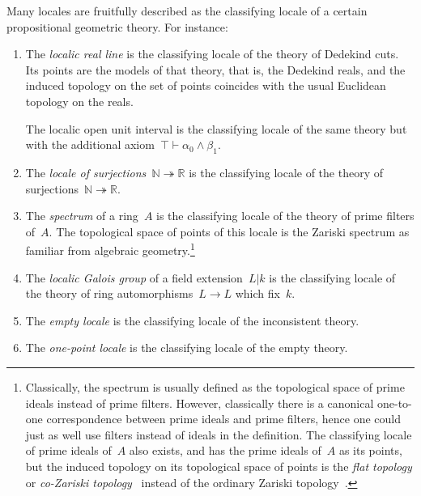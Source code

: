 \documentclass{ws-rv9x6}
\newcommand{\NN}{\mathbb{N}}
\newcommand{\RR}{\mathbb{R}}
\renewcommand{\_}{\mathpunct{.}}
\newcommand{\?}{\,{:}\,}
\begin{document}
Many locales are fruitfully described as the classifying locale of a certain
propositional geometric theory. For instance:
\begin{enumerate}
\item The \emph{localic real line} is the classifying locale of the theory of
Dedekind cuts. Its points are the models of that theory, that is, the Dedekind
reals, and the induced topology on the set of points coincides with the usual
Euclidean topology on the reals.

The localic open unit interval is the classifying locale of the
same theory but with the additional axiom~$\top \vdash \alpha_0 \wedge \beta_1$.
\item The \emph{locale of surjections~$\NN \twoheadrightarrow \RR$} is the
classifying locale of the theory of surjections~$\NN \twoheadrightarrow \RR$.
\item The \emph{spectrum} of a ring~$A$ is the classifying locale of the
theory of prime filters of~$A$. The topological space of points of this locale
is the Zariski spectrum as familiar from algebraic
geometry.\footnote{Classically, the spectrum is usually defined as the
topological space of prime ideals instead of prime filters. However,
classically there is a canonical one-to-one correspondence between prime ideals
and prime filters, hence one could just as well use filters instead of ideals
in the definition. The classifying locale of prime ideals of~$A$ also exists,
and has the prime ideals of~$A$ as its points, but the induced topology on its
topological space of points is the \emph{flat topology} or \emph{co-Zariski
topology}~\cite{tarizadeh:flat} instead of the ordinary
Zariski topology~\cite[Proposition~4.5]{johnstone:rings-fields-and-spectra}.}
\item The \emph{localic Galois group} of a field extension~$L|k$ is the
classifying locale of the theory of ring automorphisms~$L \to L$ which fix~$k$.
\item The \emph{empty locale} is the classifying locale of the inconsistent theory.
\item The \emph{one-point locale} is the classifying locale of the empty theory.
\end{enumerate}
\end{document}
